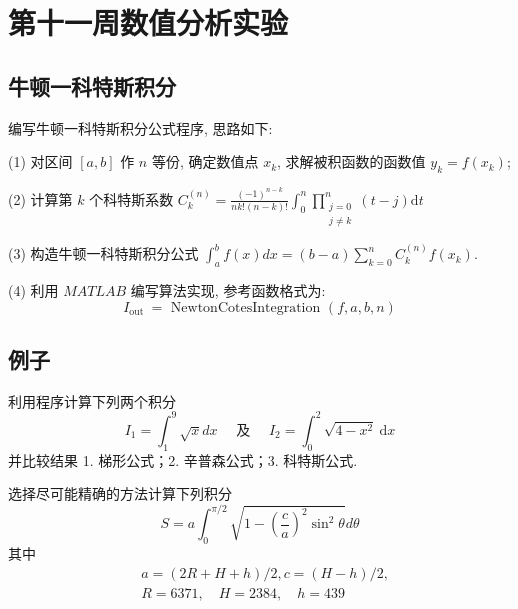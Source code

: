 \section{第十一周数值分析实验}
\subsection{牛顿一科特斯积分}
\begin{ex}
	编写牛顿一科特斯积分公式程序, 思路如下:
	
	(1) 对区间 $[a, b]$ 作 $n$ 等份, 确定数值点 $x_k$, 求解被积函数的函数值 $y_k=f\left(x_k\right)$;
	
	(2) 计算第 $k$ 个科特斯系数 $C_k^{(n)}=\frac{(-1)^{n-k}}{n k !(n-k) !} \int_0^n \prod_{\substack{j=0 \\ j \neq k}}^n(t-j) \mathrm{d} t$
	
	(3) 构造牛顿一科特斯积分公式 $\int_a^b f(x) d x=(b-a) \sum_{k=0}^n C_k^{(n)} f\left(x_k\right)$.
	
	(4) 利用 $M A T L A B$ 编写算法实现, 参考函数格式为:
	$$
	I_{\text {out }}=\text { NewtonCotesIntegration }(f, a, b, n)
	$$
\end{ex}

\subsection*{例子}
\begin{ex}
	利用程序计算下列两个积分
	$$
	I_1=\int_1^9 \sqrt{x} d x \quad \text { 及 } \quad I_2=\int_0^2 \sqrt{4-x^2} \mathrm{~d} x
	$$
	并比较结果
	1. 梯形公式；2. 辛普森公式；3. 科特斯公式.
\end{ex}

\begin{ex}
	选择尽可能精确的方法计算下列积分
	$$
	S=a \int_0^{\pi / 2} \sqrt{1-\left(\frac{c}{a}\right)^2 \sin ^2 \theta} d \theta
	$$
	其中
	$$
	\begin{aligned}
		& a=(2 R+H+h) / 2, c=(H-h) / 2, \\
		& R=6371, \quad H=2384, \quad h=439
	\end{aligned}
	$$
\end{ex}


